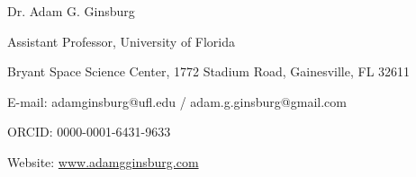 \begin{center}
{\large Dr. Adam G. Ginsburg}\\
\par Assistant Professor, University of Florida
\par Bryant Space Science Center,
1772 Stadium Road,
Gainesville, FL 32611
\par E-mail: adamginsburg@ufl.edu / adam.g.ginsburg@gmail.com
\par ORCID: 0000-0001-6431-9633
\par Website: \url{www.adamgginsburg.com}
\end{center}


